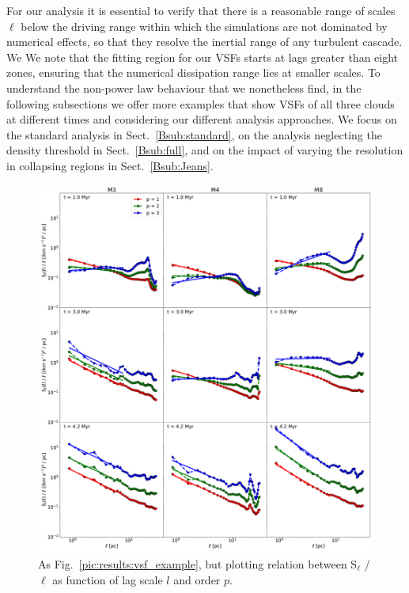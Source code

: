 \documentclass{aa}		%
\begin{document}
For our analysis it is essential to verify that there is a reasonable range of scales $\ell$ below the driving range within which the simulations are not dominated by numerical effects, so that they resolve the inertial range of any turbulent cascade.  
We We note that the fitting region for our VSFs starts at lags greater than eight zones, ensuring that the numerical dissipation range lies at smaller scales.
To understand the non-power law behaviour that we nonetheless find, in the following subsections we offer more examples that show VSFs of all three clouds at different times and considering our different analysis approaches. 
We focus on the standard analysis in Sect.~\ref{Bsub:standard}, on the analysis neglecting the density threshold in Sect.~\ref{Bsub:full}, and on the impact of varying the resolution in collapsing regions in Sect.~\ref{Bsub:Jeans}.

 	
\begin{figure}
    \centering
    \includegraphics[width=\textwidth]{app_examples_wthres_sl_l.pdf}
    \caption{
        As Fig.~\ref{pic:results:vsf_example}, but plotting relation between S$_{\ell}$ / $\ell$ as function of lag scale $l$ and order $p$.
    }
    \label{pic:appInertial:examples_with_threshold_sl_vs_l}
\end{figure}
 	
\end{document}
